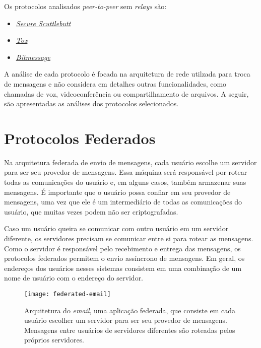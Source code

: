 Os protocolos analisados \textit{peer-to-peer} sem \textit{relays} são:
\begin{itemize}
  \item \href{https://scuttlebutt.nz/}{\textit{Secure Scuttlebutt}}
  \item \href{https://tox.chat/}{\textit{Tox}}
  \item \href{https://bitmessage.org/}{\textit{Bitmessage}}
\end{itemize}

A análise de cada protocolo é focada na arquitetura de rede utilzada para troca de mensagens e não considera em detalhes outras funcionalidades, como chamadas de voz, videoconferência ou compartilhamento de arquivos. A seguir, são apresentadas as análises dos protocolos selecionados.

\section{Protocolos Federados}

Na arquitetura federada de envio de mensagens, cada usuário escolhe um servidor para ser seu provedor de mensagens. Essa máquina será responsável por rotear todas as comunicações do usuário e, em alguns casos, também armazenar suas mensagens. É importante que o usuário possa confiar em seu provedor de mensagens, uma vez que ele é um intermediário de todas as comunicações do usuário, que muitas vezes podem não ser criptografadas.

Caso um usuário queira se comunicar com outro usuário em um servidor diferente, os servidores precisam se comunicar entre si para rotear as mensagens. Como o servidor é responsável pelo recebimento e entrega das mensagens, os protocolos federados permitem o envio assíncrono de mensagens. Em geral, os endereços dos usuários nesses sistemas consistem em uma combinação de um nome de usuário com o endereço do servidor.

\begin{figure}
  \centering
  \texttt{[image: federated-email]}

  \caption{Arquitetura do \textit{email}, uma aplicação federada, que consiste em cada usuário escolher um servidor para ser seu provedor de mensagens. Mensagens entre usuários de servidores diferentes são roteadas pelos próprios servidores. \cite{email-picture}}
  \label{fig:federated-email}
\end{figure}

